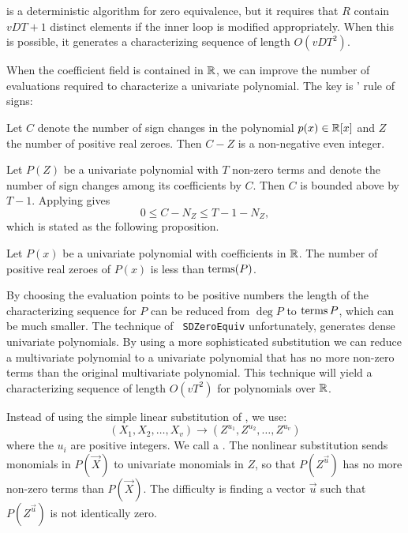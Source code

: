  is a deterministic algorithm for zero equivalence,
but it requires that $R$ contain $vDT+1$ distinct elements if the
inner loop is modified appropriately.  When this is possible, it
generates a characterizing sequence of length $O(vDT^2)$.

When the coefficient field is contained in $\mathbb{R}$, we can improve the
number of evaluations required to characterize a univariate
polynomial.  The key is {\Descartes}' rule of signs:

\begin{proposition}[Descartes]
\label{Descartes:Sign:Prop}
Let $C$ denote the number of sign changes in the polynomial $p(x) \in
\mathbb{R}[x]$ and $Z$ the number of positive real zeroes.  Then $C - Z$ is a
non-negative even integer.
\end{proposition} 


Let $P(Z)$ be a univariate polynomial with $T$ non-zero
terms and denote the number of sign changes among its coefficients by
$C$.  Then $C$ is bounded above by $T-1$.  Applying
 gives 
\[
0 \le C - N_Z \le T - 1 - N_Z,
\]
which is stated as the following proposition.

\begin{proposition}
\label{Positive:Zeroes:Prop}
Let $P(x)$ be a univariate polynomial with coefficients in $\mathbb{R}$.  The
number of positive real zeroes of $P(x)$ is less than $\mathop{\rm terms}\nolimits(P)$.
\end{proposition}

By choosing the evaluation points to be positive numbers the length of
the characterizing sequence for $P$ can be reduced from $\deg P$ to
$\mathop{\rm terms}\nolimits P$, which can be much smaller.  The technique of {\tt
SDZeroEquiv} unfortunately, generates dense univariate polynomials.
By using a more sophisticated substitution we can reduce a
multivariate polynomial to a univariate polynomial that has no more
non-zero terms than the original multivariate polynomial.  This
technique will yield a characterizing sequence of length $O(vT^2)$ for
polynomials over $\mathbb{R}$.

\medskip
Instead of using the simple linear substitution of
, we use:
\begin{equation} \label{Zero:MultiSub:Eq}
(X_1, X_2, \ldots, X_v) \longrightarrow
  (Z^{u_1}, Z^{u_2}, \ldots, Z^{u_v})
\end{equation}
where the $u_i$ are positive integers.  We call
 a .  The
nonlinear substitution sends monomials in $P(\vec{X})$ to univariate
monomials in $Z$, so that $P(Z^{\vec{u}})$ has no more non-zero terms
than $P(\vec{X})$.  The difficulty is finding a vector $\vec{u}$ such
that $P(Z^{\vec{u}})$ is not identically zero.

